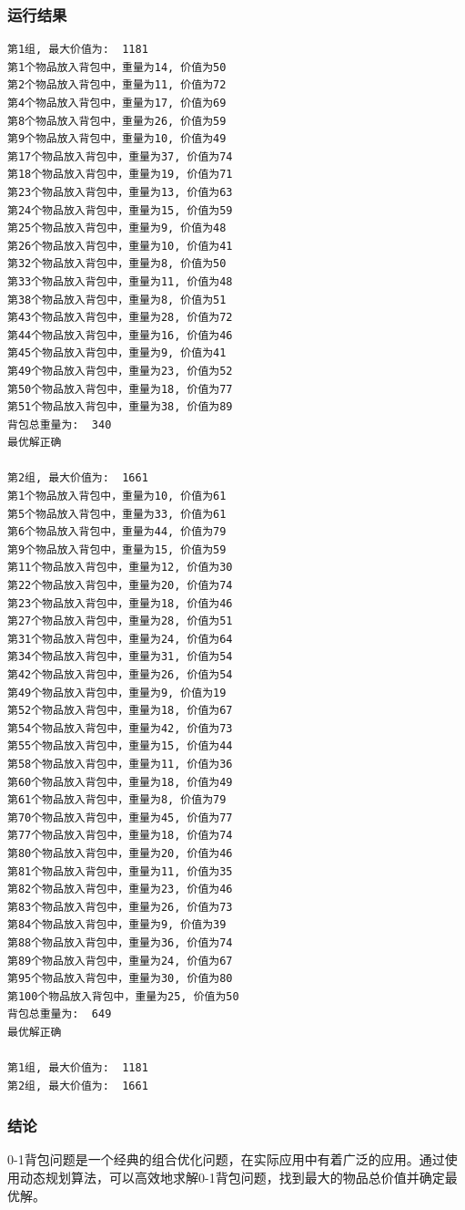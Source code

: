 \documentclass[lang=cn,11pt,a4paper]{elegantpaper}
\begin{document}
\subsubsection{运行结果}
\begin{lstlisting}[language=text]
第1组, 最大价值为:  1181
第1个物品放入背包中，重量为14, 价值为50
第2个物品放入背包中，重量为11, 价值为72
第4个物品放入背包中，重量为17, 价值为69
第8个物品放入背包中，重量为26, 价值为59
第9个物品放入背包中，重量为10, 价值为49
第17个物品放入背包中，重量为37, 价值为74
第18个物品放入背包中，重量为19, 价值为71
第23个物品放入背包中，重量为13, 价值为63
第24个物品放入背包中，重量为15, 价值为59
第25个物品放入背包中，重量为9, 价值为48
第26个物品放入背包中，重量为10, 价值为41
第32个物品放入背包中，重量为8, 价值为50
第33个物品放入背包中，重量为11, 价值为48
第38个物品放入背包中，重量为8, 价值为51
第43个物品放入背包中，重量为28, 价值为72
第44个物品放入背包中，重量为16, 价值为46
第45个物品放入背包中，重量为9, 价值为41
第49个物品放入背包中，重量为23, 价值为52
第50个物品放入背包中，重量为18, 价值为77
第51个物品放入背包中，重量为38, 价值为89
背包总重量为:  340
最优解正确

第2组, 最大价值为:  1661
第1个物品放入背包中，重量为10, 价值为61
第5个物品放入背包中，重量为33, 价值为61
第6个物品放入背包中，重量为44, 价值为79
第9个物品放入背包中，重量为15, 价值为59
第11个物品放入背包中，重量为12, 价值为30
第22个物品放入背包中，重量为20, 价值为74
第23个物品放入背包中，重量为18, 价值为46
第27个物品放入背包中，重量为28, 价值为51
第31个物品放入背包中，重量为24, 价值为64
第34个物品放入背包中，重量为31, 价值为54
第42个物品放入背包中，重量为26, 价值为54
第49个物品放入背包中，重量为9, 价值为19
第52个物品放入背包中，重量为18, 价值为67
第54个物品放入背包中，重量为42, 价值为73
第55个物品放入背包中，重量为15, 价值为44
第58个物品放入背包中，重量为11, 价值为36
第60个物品放入背包中，重量为18, 价值为49
第61个物品放入背包中，重量为8, 价值为79
第70个物品放入背包中，重量为45, 价值为77
第77个物品放入背包中，重量为18, 价值为74
第80个物品放入背包中，重量为20, 价值为46
第81个物品放入背包中，重量为11, 价值为35
第82个物品放入背包中，重量为23, 价值为46
第83个物品放入背包中，重量为26, 价值为73
第84个物品放入背包中，重量为9, 价值为39
第88个物品放入背包中，重量为36, 价值为74
第89个物品放入背包中，重量为24, 价值为67
第95个物品放入背包中，重量为30, 价值为80
第100个物品放入背包中，重量为25, 价值为50
背包总重量为:  649
最优解正确

第1组, 最大价值为:  1181
第2组, 最大价值为:  1661
\end{lstlisting}
\subsubsection{结论}
0-1背包问题是一个经典的组合优化问题，在实际应用中有着广泛的应用。通过使用动态规划算法，可以高效地求解0-1背包问题，找到最大的物品总价值并确定最优解。
\end{document}
